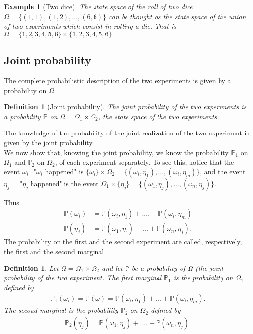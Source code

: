 \documentclass[12pt]{article}
\newtheorem{definition}[theorem]{Definition}
\newtheorem{example}[theorem]{Example}
\newcommand{\<}{{\langle \!\! \langle}}
\renewcommand{\>}{{\rangle \!\! \rangle}}
\newcommand{\bel}[2]{\begin{equation} \label{#1} \begin{split} #2
 					\end{split} \end{equation}}
\begin{document}
\begin{example}[Two dice] The state space of the roll of two dice $\Omega=\{(1,1),(1,2),...,(6,6)\}$ can be thought as the state space of the union of two experiments which consist in rolling a die. That is $\Omega=\{1,2,3,4,5,6\}\times \{1,2,3,4,5,6\}$\\
\end{example}


\subsection{Joint probability}

The complete probabilistic description of the two experiments is given by a probability on $\Omega$
\begin{definition}[Joint probability]
The joint probability of the two experiments is a probability $\mathbb{P}$ on $\Omega=\Omega_1\times \Omega_2$, the state space of the two experiments.
\end{definition}

The knowledge of the probability of the joint realization of the two experiment is given by the joint probability. \\

We now show that, knowing the joint probability, we know the probability $\mathbb{P}_1$ on $\Omega_1$ and $\mathbb{P}_2$ on $\Omega_2$, of each experiment separately.
To see this, notice that the event $\omega_i$="$\omega_i$ happened" is $\{\omega_i\}\times\Omega_2=\{(\omega_i,\eta_1),...,(\omega_i,\eta_m)\}$, and the event $\eta_j$ = "$\eta_j$ happened" is the event $\Omega_1\times\{\eta_j\}=\{(\omega_1,\eta_j),...,(\omega_n,\eta_j)\}$.  

Thus 
\bel{}{\mathbb{P}(\omega_i) &= \mathbb{P}(\omega_i,\eta_1)+....+\mathbb{P}(\omega_i,\eta_m) \\
\mathbb{P}(\eta_j) &= \mathbb{P}(\omega_1,\eta_j)+...+\mathbb{P}(\omega_n,\eta_j).}
The probability on the first and the second experiment are called, respectively, the first and the second marginal
\begin{definition}
Let $\Omega= \Omega_1\times \Omega_2$ and let $\mathbb{P}$ be a probability of $\Omega$ (the joint probability of the two experiment.
The first marginal $\mathbb{P}_1$ is the probability on $\Omega_1$ defined by
\bel{d:marg1}{\mathbb{P}_1(\omega_i) = \mathbb{P}(\omega)=\mathbb{P}(\omega_i,\eta_1)+...+\mathbb{P}(\omega_i,\eta_m).}
The second marginal is the probability $\mathbb{P}_2$ on $\Omega_2$ defined by 
\bel{d:marg2}{\mathbb{P}_2(\eta_j) = \mathbb{P}(\omega_1,\eta_j)+....+ \mathbb{P}(\omega_n, \eta_j).}
\end{definition}
\end{document}
